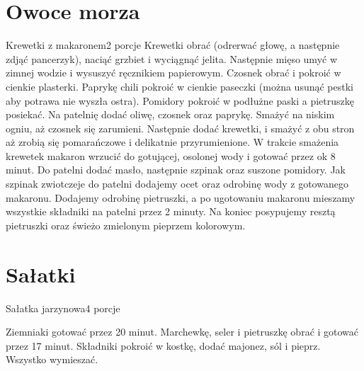 \documentclass[a4paper,12pt]{article}
\begin{document}
\section{Owoce morza}

\begin{recipe}{Krewetki z makaronem}{2 porcje}{}
Krewetki obrać (odrerwać głowę, a następnie zdjąć pancerzyk), naciąć grzbiet i wyciągnąć jelita. Następnie mięso umyć w zimnej wodzie i wysuszyć ręcznikiem papierowym.
Czosnek obrać i pokroić w cienkie plasterki. Paprykę chili pokroić w cienkie paseczki (można usunąć pestki aby potrawa nie wyszła ostra).
Pomidory pokroić w podłużne paski a pietruszkę posiekać.
Na patelnię dodać oliwę, czosnek oraz paprykę. Smażyć na niskim ogniu, aż czosnek się zarumieni.
Następnie dodać krewetki, i smażyć z obu stron aż zrobią się pomarańczowe i delikatnie przyrumienione.
\freeform%
W trakcie smażenia krewetek makaron wrzucić do gotującej, osolonej wody i gotować przez ok 8 minut. Do patelni dodać masło, następnie szpinak oraz suszone pomidory. Jak szpinak zwiotczeje do patelni dodajemy ocet oraz odrobinę wody z gotowanego makaronu. Dodajemy odrobinę pietruszki, a po ugotowaniu makaronu mieszamy wszystkie składniki na patelni przez 2 minuty. Na koniec posypujemy resztą pietruszki oraz świeżo zmielonym pieprzem kolorowym.

\end{recipe}

\newpage
\section{Sałatki}

\begin{recipe}{Sałatka jarzynowa}{4 porcje}{}

Ziemniaki gotować przez 20 minut. Marchewkę, seler i pietruszkę obrać i gotować przez 17 minut.
Składniki pokroić w kostkę, dodać majonez, sól i pieprz. Wszystko wymieszać.

\end{recipe}
\end{document}
